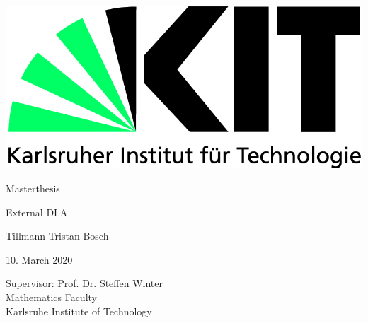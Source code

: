 \documentclass[12pt,a4paper]{scrartcl}
\numberwithin{equation}{section}
\numberwithin{equation}{section}%
\theoremstyle{definition}
\theoremstyle{definition}
\begin{document}
	\pagestyle{empty}

\begin{titlepage}

	\includegraphics[scale=0.45]{kit-logo.jpg} 
    \vspace*{2cm} 
\begin{center} \large 
    
   Masterthesis
    \vspace*{2cm}

    {\huge External DLA}\\
    \vspace*{2.5cm}

    Tillmann Tristan Bosch
    \vspace*{1.5cm}

    10. March 2020
    \vspace*{3.5cm}


    Supervisor: Prof. Dr. Steffen Winter \\[1cm]
    Mathematics Faculty\\[1cm]
	Karlsruhe Institute of Technology
\end{center}
\end{titlepage}

\newpage

\newpage
\phantom \\
\newpage

\tableofcontents %

 	\pagestyle{headings}

\setcounter{page}{1}
\end{document}
